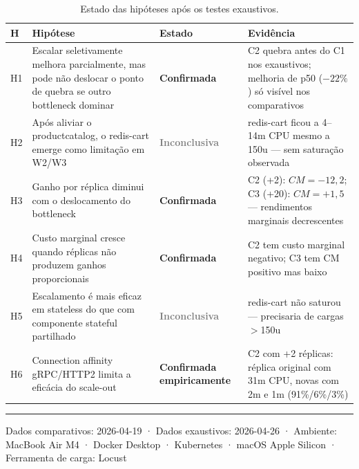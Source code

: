 \documentclass[a4paper,11pt]{article}
\begin{document}
\begin{table}[h]
\centering
\caption{Estado das hipóteses após os testes exaustivos.}
\begin{tabular}{p{0.5cm}p{5.5cm}p{1.5cm}p{5.5cm}}
\toprule
\textbf{H} & \textbf{Hipótese} & \textbf{Estado} & \textbf{Evidência} \\
\midrule
H1 & Escalar seletivamente melhora parcialmente, mas pode não deslocar o ponto de quebra se outro bottleneck dominar & \textcolor{okgreen}{\textbf{Confirmada}} & C2 quebra antes do C1 nos exaustivos; melhoria de p50 ($-22\%$) só visível nos comparativos \\
H2 & Após aliviar o productcatalog, o redis-cart emerge como limitação em W2/W3 & \textcolor{gray}{\textbf{Inconclusiva}} & redis-cart ficou a 4--14m CPU mesmo a 150u — sem saturação observada \\
H3 & Ganho por réplica diminui com o deslocamento do bottleneck & \textcolor{okgreen}{\textbf{Confirmada}} & C2 (+2): $CM=-12{,}2$; C3 (+20): $CM=+1{,}5$ — rendimentos marginais decrescentes \\
H4 & Custo marginal cresce quando réplicas não produzem ganhos proporcionais & \textcolor{okgreen}{\textbf{Confirmada}} & C2 tem custo marginal negativo; C3 tem CM positivo mas baixo \\
H5 & Escalamento é mais eficaz em stateless do que com componente stateful partilhado & \textcolor{gray}{\textbf{Inconclusiva}} & redis-cart não saturou — precisaria de cargas $>$150u \\
H6 & Connection affinity gRPC/HTTP2 limita a eficácia do scale-out & \textcolor{okgreen}{\textbf{Confirmada empiricamente}} & C2 com +2 réplicas: réplica original com 31m CPU, novas com 2m e 1m (91\%/6\%/3\%) \\
\bottomrule
\end{tabular}
\end{table}

\vspace{2em}
\hrule
\vspace{0.5em}
{\small Dados comparativos: 2026-04-19 · Dados exaustivos: 2026-04-26 · Ambiente: MacBook Air M4 · Docker Desktop · Kubernetes · macOS Apple Silicon · Ferramenta de carga: Locust}
\end{document}
